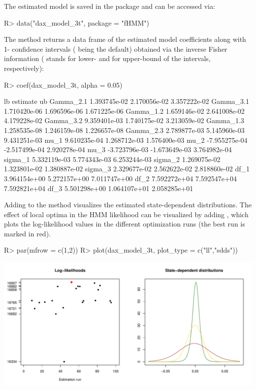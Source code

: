 \documentclass[article,shortnames]{jss}
\newcommand{\fct}[1]{\code{#1()}}
\begin{document}
The estimated model is saved in the  package and can be accessed via:

%
\begin{Schunk}
\begin{Sinput}
R> data("dax_model_3t", package = "fHMM")
\end{Sinput}
\end{Schunk}
%

The \fct{coef} method returns a data frame of the estimated model coefficients along with 1- confidence intervals ( being the default) obtained via the inverse Fisher information ( stands for lower- and  for upper-bound of the intervals, respectively):

%
\begin{Schunk}
\begin{Sinput}
R> coef(dax_model_3t, alpha = 0.05)
\end{Sinput}
\begin{Soutput}
                     lb      estimate           ub
Gamma_2.1  1.393745e-02  2.170056e-02 3.357222e-02
Gamma_3.1  1.710420e-06  1.696596e-06 1.671225e-06
Gamma_1.2  1.659146e-02  2.641008e-02 4.179228e-02
Gamma_3.2  9.359401e-03  1.740175e-02 3.213059e-02
Gamma_1.3  1.258535e-08  1.246159e-08 1.226657e-08
Gamma_2.3  2.789877e-03  5.145960e-03 9.431251e-03
mu_1       9.610235e-04  1.268712e-03 1.576400e-03
mu_2      -7.955275e-04 -2.517499e-04 2.920278e-04
mu_3      -3.723796e-03 -1.673649e-03 3.764982e-04
sigma_1    5.332119e-03  5.774343e-03 6.253244e-03
sigma_2    1.269075e-02  1.323801e-02 1.380887e-02
sigma_3    2.329677e-02  2.562622e-02 2.818860e-02
df_1       3.964154e+00  5.272157e+00 7.011747e+00
df_2       7.592272e+04  7.592547e+04 7.592821e+04
df_3       5.501298e+00  1.064107e+01 2.058285e+01
\end{Soutput}
\end{Schunk}
%

Adding  to the \fct{plot} method visualizes the estimated state-dependent distributions. The effect of local optima in the HMM likelihood can be visualized by adding , which plots the log-likelihood values in the different optimization runs (the best run is marked in red).

%
\begin{Schunk}
\begin{Sinput}
R> par(mfrow = c(1,2))
R> plot(dax_model_3t, plot_type = c("ll","sdds"))
\end{Sinput}
\end{Schunk}
\includegraphics{fhmm_oelschlaeger_adam_michels-dax-sdds-ll}
%
\end{document}
